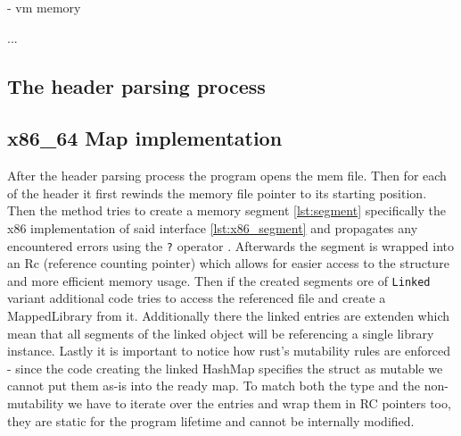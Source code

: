 - vm memory

...

\subsection{The header parsing process}

\subsection{x86\_64 Map implementation}

After the header parsing process the program opens the mem file.
Then for each of the header it first rewinds the memory file pointer to its starting position.
Then the method tries to create a memory segment \ref{lst:segment} specifically the x86 implementation of said interface \ref{lst:x86_segment} and propagates any encountered errors using the \verb|?| operator \cite{TODO}.
Afterwards the segment is wrapped into an Rc (reference counting pointer) which allows for easier access to the structure and more efficient memory usage. 
Then if the created segments ore of \verb|Linked| variant additional code tries to access the referenced file and create a MappedLibrary from it.
Additionally there the linked entries are extenden which mean that all segments of the linked object will be referencing a single library instance.
Lastly it is important to notice how rust's mutability rules are enforced - since the code creating the linked HashMap specifies the struct as mutable we cannot put them as-is into the ready map.
To match both the type and the non-mutability we have to iterate over the entries and wrap them in RC pointers too, they are static for the program lifetime and cannot be internally modified. 


